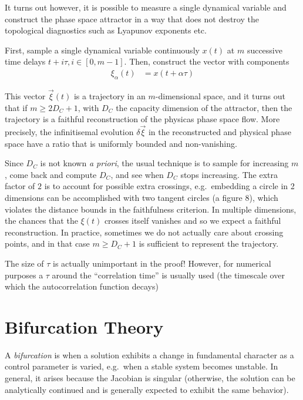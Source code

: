 \documentclass[10pt]{article}
\begin{document}
It turns out however, it is possible to measure a single dynamical variable and
construct the phase space attractor in a way that does not destroy the
topological diagnostics such as Lyapunov exponents etc.

First, sample a single dynamical variable continuously $x(t)$ at $m$ successive
time delays $t + i\tau, i \in [0,m-1]$. Then, construct the vector with
components
\begin{align}
    \xi_\alpha(t) &= x(t + \alpha\tau)
\end{align}

This vector $\vec{\xi}(t)$ is a trajectory in an $m$-dimensional space, and it
turns out that if $m \geq 2D_C + 1$, with $D_C$ the capacity dimension of the
attractor, then the trajectory is a faithful reconstruction of the physicas
phase space flow. More precisely, the infinitisemal evolution $\delta\vec{\xi}$
in the reconstructed and physical phase space have a ratio that is uniformly
bounded and non-vanishing.

Since $D_C$ is not known \emph{a priori}, the usual technique is to sample for
increasing $m$, come back and compute $D_C$, and see when $D_C$ stops
increasing. The extra factor of $2$ is to account for possible extra crossings,
e.g.\ embedding a circle in 2 dimensions can be accomplished with two tangent
circles (a figure $8$), which violates the distance bounds in the faithfulness
criterion. In multiple dimensions, the chances that the $\xi(t)$ crosses itself
vanishes and so we expect a faithful reconstruction. In practice, sometimes we
do not actually care about crossing points, and in that case $m \geq D_C + 1$ is
sufficient to represent the trajectory.

The size of $\tau$ is actually unimportant in the proof! However, for numerical
purposes a $\tau$ around the ``correlation time'' is usually used (the timescale
over which the autocorrelation function decays)

\clearpage

\section{Bifurcation Theory}

A \emph{bifurcation} is when a solution exhibits a change in fundamental
character as a control parameter is varied, e.g.\ when a stable system becomes
unstable. In general, it arises because the Jacobian is singular (otherwise, the
solution can be analytically continued and is generally expected to exhibit the
same behavior).
\end{document}
